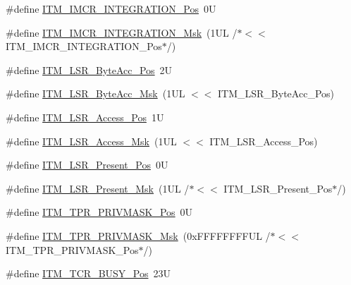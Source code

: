 \begin{DoxyCompactItemize}
\item 
\#define \mbox{\hyperlink{group___c_m_s_i_s___i_t_m_ga08de02bf32caf48aaa29f7c68ff5d755}{I\+T\+M\+\_\+\+I\+M\+C\+R\+\_\+\+I\+N\+T\+E\+G\+R\+A\+T\+I\+O\+N\+\_\+\+Pos}}~0U
\item 
\#define \mbox{\hyperlink{group___c_m_s_i_s___i_t_m_ga8838bd3dd04c1a6be97cd946364a3fd2}{I\+T\+M\+\_\+\+I\+M\+C\+R\+\_\+\+I\+N\+T\+E\+G\+R\+A\+T\+I\+O\+N\+\_\+\+Msk}}~(1\+U\+L /$\ast$$<$$<$ I\+T\+M\+\_\+\+I\+M\+C\+R\+\_\+\+I\+N\+T\+E\+G\+R\+A\+T\+I\+O\+N\+\_\+\+Pos$\ast$/)
\item 
\#define \mbox{\hyperlink{group___c_m_s_i_s___i_t_m_gabfae3e570edc8759597311ed6dfb478e}{I\+T\+M\+\_\+\+L\+S\+R\+\_\+\+Byte\+Acc\+\_\+\+Pos}}~2U
\item 
\#define \mbox{\hyperlink{group___c_m_s_i_s___i_t_m_ga91f492b2891bb8b7eac5b58de7b220f4}{I\+T\+M\+\_\+\+L\+S\+R\+\_\+\+Byte\+Acc\+\_\+\+Msk}}~(1\+U\+L $<$$<$ I\+T\+M\+\_\+\+L\+S\+R\+\_\+\+Byte\+Acc\+\_\+\+Pos)
\item 
\#define \mbox{\hyperlink{group___c_m_s_i_s___i_t_m_ga144a49e12b83ad9809fdd2769094fdc0}{I\+T\+M\+\_\+\+L\+S\+R\+\_\+\+Access\+\_\+\+Pos}}~1U
\item 
\#define \mbox{\hyperlink{group___c_m_s_i_s___i_t_m_gac8ae69f11c0311da226c0c8ec40b3d37}{I\+T\+M\+\_\+\+L\+S\+R\+\_\+\+Access\+\_\+\+Msk}}~(1\+U\+L $<$$<$ I\+T\+M\+\_\+\+L\+S\+R\+\_\+\+Access\+\_\+\+Pos)
\item 
\#define \mbox{\hyperlink{group___c_m_s_i_s___i_t_m_gaf5740689cf14564d3f3fd91299b6c88d}{I\+T\+M\+\_\+\+L\+S\+R\+\_\+\+Present\+\_\+\+Pos}}~0U
\item 
\#define \mbox{\hyperlink{group___c_m_s_i_s___i_t_m_gaa5bc2a7f5f1d69ff819531f5508bb017}{I\+T\+M\+\_\+\+L\+S\+R\+\_\+\+Present\+\_\+\+Msk}}~(1\+U\+L /$\ast$$<$$<$ I\+T\+M\+\_\+\+L\+S\+R\+\_\+\+Present\+\_\+\+Pos$\ast$/)
\item 
\#define \mbox{\hyperlink{group___c_m_s_i_s___i_t_m_ga7abe5e590d1611599df87a1884a352e8}{I\+T\+M\+\_\+\+T\+P\+R\+\_\+\+P\+R\+I\+V\+M\+A\+S\+K\+\_\+\+Pos}}~0U
\item 
\#define \mbox{\hyperlink{group___c_m_s_i_s___i_t_m_ga168e089d882df325a387aab3a802a46b}{I\+T\+M\+\_\+\+T\+P\+R\+\_\+\+P\+R\+I\+V\+M\+A\+S\+K\+\_\+\+Msk}}~(0x\+F\+F\+F\+F\+F\+F\+F\+F\+U\+L /$\ast$$<$$<$ I\+T\+M\+\_\+\+T\+P\+R\+\_\+\+P\+R\+I\+V\+M\+A\+S\+K\+\_\+\+Pos$\ast$/)
\item 
\#define \mbox{\hyperlink{group___c_m_s_i_s___i_t_m_ga9174ad4a36052c377cef4e6aba2ed484}{I\+T\+M\+\_\+\+T\+C\+R\+\_\+\+B\+U\+S\+Y\+\_\+\+Pos}}~23U
\item 

\end{DoxyCompactItemize}
